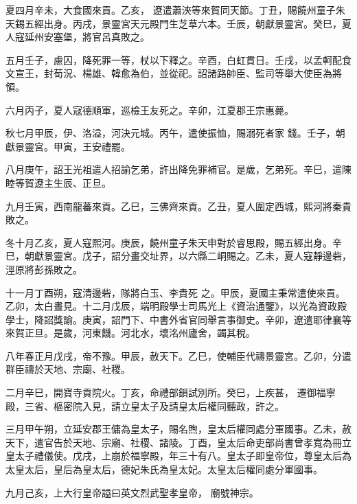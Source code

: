 \begin{pinyinscope}
 夏四月辛未，大食國來貢。乙亥，
 遼遣蕭浹等來賀同天節。丁丑，賜饒州童子朱天錫五經出身。丙戌，景靈宮天元殿門生芝草六本。壬辰，朝獻景靈宮。癸巳，夏人寇延州安塞堡，將官呂真敗之。



 五月壬子，慮囚，降死罪一等，杖以下釋之。辛酉，白虹貫日。壬戌，以孟軻配食文宣王，封荀況、楊雄、韓愈為伯，並從祀。詔諸路帥臣、監司等舉大使臣為將領。



 六月丙子，夏人寇德順軍，巡檢王友死之。辛卯，江夏郡王宗惠薨。



 秋七月甲辰，伊、洛溢，河決元城。丙午，遣使振恤，賜溺死者家
 錢。壬子，朝獻景靈宮。甲寅，王安禮罷。



 八月庚午，詔王光祖遣人招諭乞弟，許出降免罪補官。是歲，乞弟死。辛巳，遣陳睦等賀遼主生辰、正旦。



 九月壬寅，西南龍蕃來貢。乙巳，三佛齊來貢。乙丑，夏人圍定西城，熙河將秦貴敗之。



 冬十月乙亥，夏人寇熙河。庚辰，饒州童子朱天申對於睿思殿，賜五經出身。辛巳，朝獻景靈宮。戊子，詔分畫交址界，以六縣二峒賜之。乙未，夏人寇靜邊砦，涇原將彭孫敗之。



 十一月丁酉朔，寇清邊砦，隊將白玉、李貴死
 之。甲辰，夏國主秉常遣使來貢。乙卯，太白晝見。十二月戊辰，端明殿學士司馬光上《資治通鑒》，以光為資政殿學士，降詔獎諭。庚寅，詔門下、中書外省官同舉言事御史。辛卯，遼遣耶律襄等來賀正旦。是歲，河東饑。河北水，壞洺州廬舍，蠲其稅。



 八年春正月戊戌，帝不豫。甲辰，赦天下。乙巳，使輔臣代禱景靈宮。乙卯，分遣群臣禱於天地、宗廟、社稷。



 二月辛巳，開寶寺貢院火。丁亥，命禮部鎖試別所。癸巳，上疾甚，
 遷御福寧殿，三省、樞密院入見，請立皇太子及請皇太后權同聽政，許之。



 三月甲午朔，立延安郡王傭為皇太子，賜名煦，皇太后權同處分軍國事。乙未，赦天下，遣官告於天地、宗廟、社稷、諸陵。丁酉，皇太后命吏部尚書曾孝寬為冊立皇太子禮儀使。戊戌，上崩於福寧殿，年三十有八。皇太子即皇帝位，尊皇太后為太皇太后，皇后為皇太后，德妃朱氏為皇太妃。太皇太后權同處分軍國事。



 九月己亥，上大行皇帝謚曰英文烈武聖孝皇帝，
 廟號神宗。




\end{pinyinscope}
